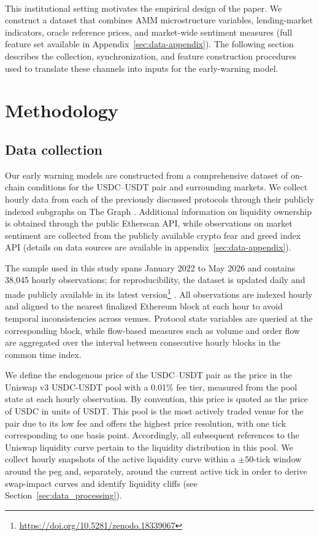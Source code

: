 \documentclass[a4paper,fleqn]{cas-sc}
\begin{document}
\paragraph{}
This institutional setting motivates the empirical design of the paper. We construct a dataset that combines AMM microstructure variables, lending-market indicators, oracle reference prices, and market-wide sentiment measures (full feature set available in Appendix~\ref{sec:data-appendix}). The following section describes the collection, synchronization, and feature construction procedures used to translate these channels into inputs for the early-warning model.

\section{Methodology}\label{sec:methodology}

 \subsection{Data collection} \label{sec:data_collection}

Our early warning models are constructed from a comprehensive dataset of on-chain conditions for the USDC--USDT pair and surrounding markets. We collect hourly data from each of the previously discussed protocols through their publicly indexed subgraphs on The Graph \citep{grtwhitepaper}. Additional information on liquidity ownership is obtained through the public Etherscan API, while observations on market sentiment are collected from the publicly available crypto fear and greed index API (details on data sources are available in appendix~\ref{sec:data-appendix}).

The sample used in this study spans January 2022 to May 2026 and contains 38{,}045 hourly observations; for reproducibility, the dataset is updated daily and made publicly available in its latest version\footnote{\url{https://doi.org/10.5281/zenodo.18339067}} \citep{Defidataset}. All observations are indexed hourly and aligned to the nearest finalized Ethereum block at each hour to avoid temporal inconsistencies across venues. Protocol state variables are queried at the corresponding block, while flow-based measures such as volume and order flow are aggregated over the interval between consecutive hourly blocks in the common time index.

We define the endogenous price of the USDC--USDT pair as the price in the Uniswap v3 USDC-USDT pool with a 0.01\% fee tier, measured from the pool state at each hourly observation. By convention, this price is quoted as the price of USDC in units of USDT. This pool is the most actively traded venue for the pair due to its low fee and offers the highest price resolution, with one tick corresponding to one basis point. Accordingly, all subsequent references to the Uniswap liquidity curve pertain to the liquidity distribution in this pool. We collect hourly snapshots of the active liquidity curve within a $\pm 50$-tick window around the peg and, separately, around the current active tick in order to derive swap-impact curves and identify liquidity cliffs (see Section~\ref{sec:data_processing}).
\end{document}
